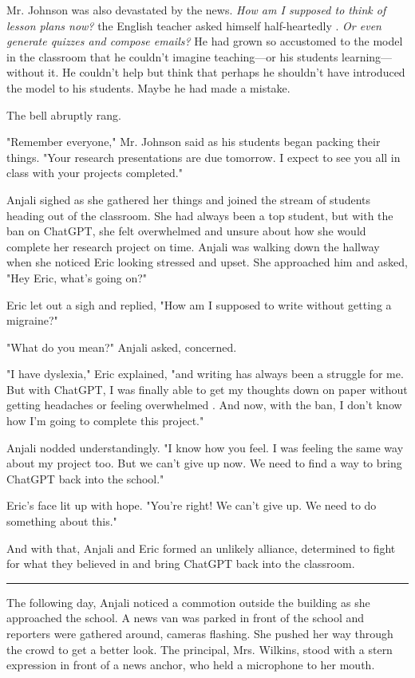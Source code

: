 \documentclass[stu]{apa7}
\begin{document}
Mr. Johnson was also devastated by the news. \emph{How am I supposed to think of lesson plans now?} the English teacher asked himself half-heartedly  \autocite{roose2023}. \emph{Or even generate quizzes and compose emails?} He had grown so accustomed to the model in the classroom that he couldn't imagine teaching---or his students learning---without it. He couldn't help but think that perhaps he shouldn't have introduced the model to his students. Maybe he had made a mistake.

The bell abruptly rang. 

"Remember everyone," Mr. Johnson said as his students began packing their things. "Your research presentations are due tomorrow. I expect to see you all in class with your projects completed." 

Anjali sighed as she gathered her things and joined the stream of students heading out of the classroom. She had always been a top student, but with the ban on ChatGPT, she felt overwhelmed and unsure about how she would complete her research project on time. Anjali was walking down the hallway when she noticed Eric looking stressed and upset. She approached him and asked, "Hey Eric, what's going on?"

Eric let out a sigh and replied, "How am I supposed to write without getting a migraine?"

"What do you mean?" Anjali asked, concerned.

"I have dyslexia," Eric explained, "and writing has always been a struggle for me. But with ChatGPT, I was finally able to get my thoughts down on paper without getting headaches or feeling overwhelmed \autocite{vice2023}. And now, with the ban, I don't know how I'm going to complete this project."

Anjali nodded understandingly. "I know how you feel. I was feeling the same way about my project too. But we can't give up now. We need to find a way to bring ChatGPT back into the school."

Eric's face lit up with hope. "You're right! We can't give up. We need to do something about this."

And with that, Anjali and Eric formed an unlikely alliance, determined to fight for what they believed in and bring ChatGPT back into the classroom.

\noindent\rule{\textwidth}{1pt}

The following day, Anjali noticed a commotion outside the building as she approached the school. A news van was parked in front of the school and reporters were gathered around, cameras flashing. She pushed her way through the crowd to get a better look. The principal, Mrs. Wilkins, stood with a stern expression in front of a news anchor, who held a microphone to her mouth.
\end{document}
